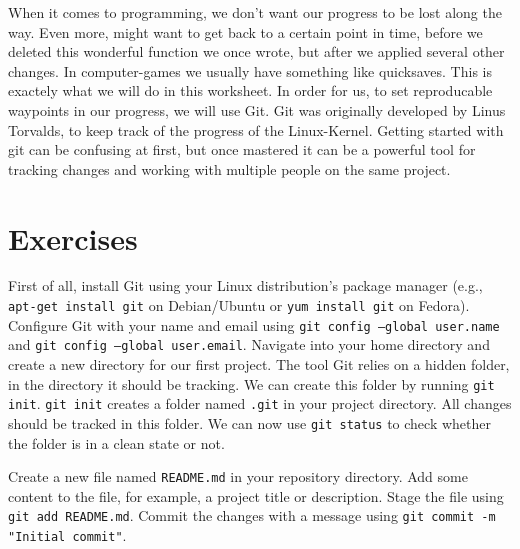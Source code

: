 \documentclass{dcbl/challenge}
\begin{document}
When it comes to programming, we don't want our progress to be lost along the way. 
Even more, might want to get back to a certain point in time, before we deleted this wonderful function we once wrote, but after we applied several other changes.
In computer-games we usually have something like quicksaves. 
This is exactely what we will do in this worksheet.
In order for us, to set reproducable waypoints in our progress, we will use Git.
Git was originally developed by Linus Torvalds, to keep track of the progress of the Linux-Kernel.
Getting started with git can be confusing at first, but once mastered it can be a powerful tool for tracking changes and working with multiple people on the same project.

\section*{Exercises}
\begin{aufgabe}
    First of all, install Git using your Linux distribution's package manager (e.g., \texttt{apt-get install git} on Debian/Ubuntu or \texttt{yum install git} on Fedora).
    Configure Git with your name and email using \texttt{git config --global user.name} and \texttt{git config --global user.email}.
    Navigate into your home directory and create a new directory for our first project.
    The tool Git relies on a hidden folder, in the directory it should be tracking. 
    We can create this folder by running \texttt{git init}.
    \texttt{git init} creates a folder named \texttt{.git} in your project directory.
    All changes should be tracked in this folder.
    We can now use \texttt{git status} to check whether the folder is in a clean state or not.
\end{aufgabe}

\begin{aufgabe}        
    Create a new file named \texttt{README.md} in your repository directory.
    Add some content to the file, for example, a project title or description.
    Stage the file using \texttt{git add README.md}.
    Commit the changes with a message using \texttt{git commit -m "Initial commit"}.
\end{aufgabe}
\end{document}
